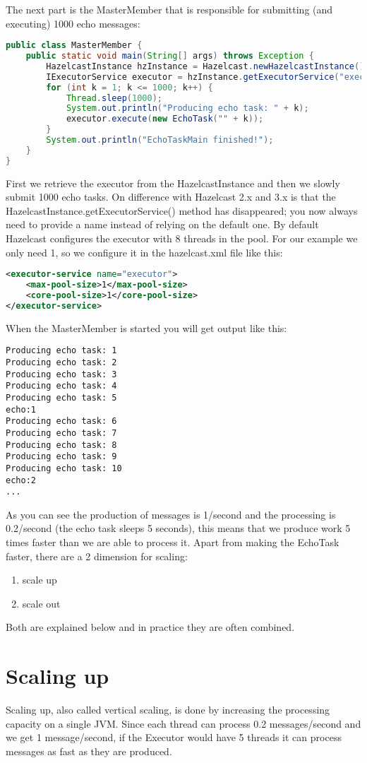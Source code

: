 The next part is the MasterMember that is responsible for submitting (and executing) 1000 echo messages:
\begin{lstlisting}[language=java]
public class MasterMember {
    public static void main(String[] args) throws Exception {
        HazelcastInstance hzInstance = Hazelcast.newHazelcastInstance();
        IExecutorService executor = hzInstance.getExecutorService("executor");
        for (int k = 1; k <= 1000; k++) {
            Thread.sleep(1000);
            System.out.println("Producing echo task: " + k);
            executor.execute(new EchoTask("" + k));
        }
        System.out.println("EchoTaskMain finished!");
    }
}
\end{lstlisting}
First we retrieve the executor from the HazelcastInstance and then we slowly submit 1000 echo tasks. On difference with Hazelcast 2.x and 3.x is that the HazelcastInstance.getExecutorService() method has disappeared; you now always need to provide a name instead of relying on the default one. By default Hazelcast configures the executor with 8 threads in the pool. For our example we only need 1, so we configure it in the hazelcast.xml file like this:
\begin{lstlisting}[language=xml]
<executor-service name="executor">
    <max-pool-size>1</max-pool-size>
    <core-pool-size>1</core-pool-size>
</executor-service>
\end{lstlisting}
When the MasterMember is started you will get output like this:
\begin{lstlisting}
Producing echo task: 1
Producing echo task: 2
Producing echo task: 3
Producing echo task: 4
Producing echo task: 5
echo:1
Producing echo task: 6
Producing echo task: 7
Producing echo task: 8
Producing echo task: 9
Producing echo task: 10
echo:2
...
\end{lstlisting}
As you can see the production of messages is 1/second and the processing is 0.2/second (the echo task sleeps 5 seconds), this means that we produce work 5 times faster than we are able to process it. Apart from making the EchoTask faster, there are a 2 dimension for scaling:
\begin{enumerate}
\item scale up 
\item scale out
\end{enumerate}
Both are explained below and in practice they are often combined. 

\section{Scaling up}
Scaling up, also called vertical scaling, is done by increasing the processing capacity on a single JVM. Since each thread can process 0.2 messages/second and we get 1 message/second, if the Executor would have 5 threads it can process messages as fast as they are produced.

